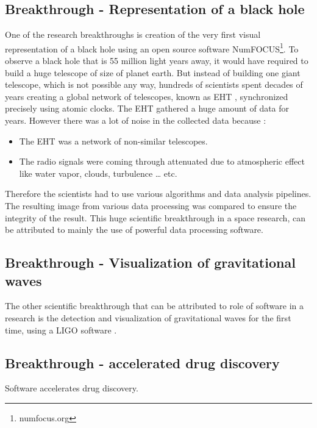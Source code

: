 \subsection{Breakthrough - Representation of a black hole  }

One of the research breakthroughs is creation of the very first visual representation of a black hole using an open source software NumFOCUS\footnote{numfocus.org}. To observe a black hole that is 55 million light years away, it would have required to build a huge telescope of size of planet earth. But instead of building one giant telescope, which is not possible any way, hundreds of scientists spent decades of years creating a global network of telescopes, known as \ac{EHT} \citep{enwiki:1052167868}, synchronized precisely using atomic clocks. The \ac{EHT} gathered a huge amount of data for years. However there was a lot of noise in the collected data because :

\vspace{-1mm}   %
	\begin{itemize}%
		\item The \ac{EHT} was a network of non-similar telescopes.
		\item The radio signals were coming through attenuated due to atmospheric effect like water vapor, clouds, turbulence … etc.
	\end{itemize}
Therefore the scientists had to use various algorithms and data analysis pipelines. The resulting image from various data processing was compared to ensure the integrity of the result. This huge scientific breakthrough in a space research, can be attributed to mainly the use of powerful data processing software. 

\subsection{Breakthrough - Visualization of gravitational waves }
The other scientific breakthrough that can be attributed to role of software in a research is the detection and visualization of gravitational waves for the first time, using a LIGO software \citep{enwiki:1047100294, mukherji2017report}. 

\subsection{Breakthrough - accelerated drug discovery }
Software accelerates drug discovery\citep{bhati2021pandemic}.



